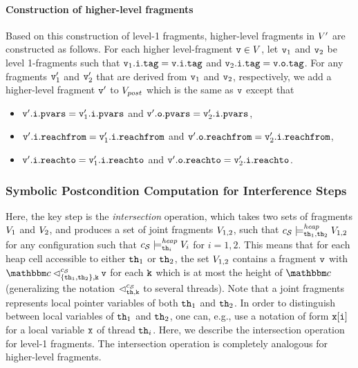\paragraph{{\bf Construction of higher-level fragments}}
Based on this construction of level-1 fragments, higher-level fragments
in $V'$ are    constructed as follows.
     For each higher level-fragment $\mathtt{v} \in V$, let
     $\mathtt{v}_1$ and $\mathtt{v}_2$ be level 1-fragments such that
     $\mathtt{v}_1.\mathtt{i}.\mathtt{tag} = \mathtt{v}.\mathtt{i}.\mathtt{tag}$ and
     $\mathtt{v}_2.\mathtt{i}.\mathtt{tag} = \mathtt{v}.\mathtt{o}.\mathtt{tag}$.
     For any fragments $\mathtt{v}_1'$ and $\mathtt{v}_2'$ that are derived from
     $\mathtt{v}_1$ and $\mathtt{v}_2$, respectively, we add a higher-level
     fragment $\mathtt{v}'$ to $V_{post}$
     which is the same as $\mathtt{v}$ except that 
\begin{itemize}
\item $\mathtt{v}'.\mathtt{i}.\mathtt{pvars} = \mathtt{v}_1'.\mathtt{i}.\mathtt{pvars}$ and
$\mathtt{v}'.\mathtt{o}.\mathtt{pvars} = \mathtt{v}_2'.\mathtt{i}.\mathtt{pvars}$,
\item $\mathtt{v}'.\mathtt{i}.\mathtt{reachfrom} = \mathtt{v}_1'.\mathtt{i}.\mathtt{reachfrom}$ and
$\mathtt{v}'.\mathtt{o}.\mathtt{reachfrom} = \mathtt{v}_2'.\mathtt{i}.\mathtt{reachfrom}$,
\item $\mathtt{v}'.\mathtt{i}.\mathtt{reachto} = \mathtt{v}_1'.\mathtt{i}.\mathtt{reachto}$ and
$\mathtt{v}'.\mathtt{o}.\mathtt{reachto} =  \mathtt{v}_2'.\mathtt{i}.\mathtt{reachto}$.
\end{itemize}



\subsubsection{Symbolic Postcondition Computation for Interference Steps} 
Here, the key step is the {\em intersection} operation, which
takes two sets of fragments
$V_1$ and $V_2$, and produces a set of joint fragments
$V_{1,2}$, such that
$c_{\mathcal S} \models_{{\tt th}_1,{\tt th}_2}^{\mathit{heap}} V_{1,2}$ for any configuration
such that
$c_{\mathcal S} \models_{{\tt th}_i}^{\mathit{heap}} V_i$ for $i=1,2$.
This means that for each heap cell accessible to either
${\tt th}_1$ or ${\tt th}_2$, the set $V_{1,2}$ 
contains a fragment $\mathtt{v}$ with $\cell \lsatfrag{\klevel}{\{\thread_1,\thread_2\}}{\sconf} \frag$ for each ${\tt k}$ which is at most the height of $\cell$
(generalizing the notation  $\lhd_{{\tt th},{\tt k}}^{c_{\mathcal S}}$ to several
threads).
Note that a joint fragments represents local pointer variables of
both ${\tt th}_1$ and ${\tt th}_2$. In order to distinguish
between local variables of ${\tt th}_1$ and ${\tt th}_2$, one can, e.g.,
use a notation of form
$\mathtt{x[i]}$ for a local variable $\mathtt{x}$ of thread ${\tt th}_i$.
Here, we describe the intersection operation for level-1 fragments. The
intersection operation is completely analogous for higher-level fragments.

